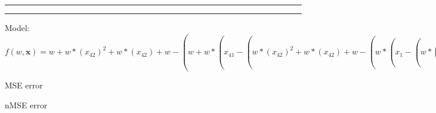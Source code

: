 \documentclass[12pt]{article}
\begin{document}
\hrule
\vspace{1cm}
\hrule
\vspace{1cm}
Model: $f(w,\mathbf{x})=w+w*(x_42)^2+w*(x_42)+w-(w+w*(x_41-(w*(x_42)^2+w*(x_42)+w-(w*(x_1-(w*(w*(sin(w+x_13-(w*(w+x_13-(w*(w+w+x_21)^2+w*(w+w+x_21)+w))^2+w*(w+x_13-(w*(w+w+x_21)^2+w*(w+w+x_21)+w))+w)))^2+w*(sin(w+x_13-(w*(w+x_13-(w*(w+w+x_21)^2+w*(w+w+x_21)+w))^2+w*(w+x_13-(w*(w+w+x_21)^2+w*(w+w+x_21)+w))+w)))+w)^2+w*(w*(sin(w+x_13-(w*(w+x_13-(w*(w+w+x_21)^2+w*(w+w+x_21)+w))^2+w*(w+x_13-(w*(w+w+x_21)^2+w*(w+w+x_21)+w))+w)))^2+w*(sin(w+x_13-(w*(w+x_13-(w*(w+w+x_21)^2+w*(w+w+x_21)+w))^2+w*(w+x_13-(w*(w+w+x_21)^2+w*(w+w+x_21)+w))+w)))+w)+w))^2+w*(x_1-(w*(w*(sin(w+x_13-(w*(w+x_13-(w*(w+w+x_21)^2+w*(w+w+x_21)+w))^2+w*(w+x_13-(w*(w+w+x_21)^2+w*(w+w+x_21)+w))+w)))^2+w*(sin(w+x_13-(w*(w+x_13-(w*(w+w+x_21)^2+w*(w+w+x_21)+w))^2+w*(w+x_13-(w*(w+w+x_21)^2+w*(w+w+x_21)+w))+w)))+w)^2+w*(w*(sin(w+x_13-(w*(w+x_13-(w*(w+w+x_21)^2+w*(w+w+x_21)+w))^2+w*(w+x_13-(w*(w+w+x_21)^2+w*(w+w+x_21)+w))+w)))^2+w*(sin(w+x_13-(w*(w+x_13-(w*(w+w+x_21)^2+w*(w+w+x_21)+w))^2+w*(w+x_13-(w*(w+w+x_21)^2+w*(w+w+x_21)+w))+w)))+w)+w))+w)))^2+w*(x_41-(w*(x_42)^2+w*(x_42)+w-(w*(x_1-(w*(w*(sin(w+x_13-(w*(w+x_13-(w*(w+w+x_21)^2+w*(w+w+x_21)+w))^2+w*(w+x_13-(w*(w+w+x_21)^2+w*(w+w+x_21)+w))+w)))^2+w*(sin(w+x_13-(w*(w+x_13-(w*(w+w+x_21)^2+w*(w+w+x_21)+w))^2+w*(w+x_13-(w*(w+w+x_21)^2+w*(w+w+x_21)+w))+w)))+w)^2+w*(w*(sin(w+x_13-(w*(w+x_13-(w*(w+w+x_21)^2+w*(w+w+x_21)+w))^2+w*(w+x_13-(w*(w+w+x_21)^2+w*(w+w+x_21)+w))+w)))^2+w*(sin(w+x_13-(w*(w+x_13-(w*(w+w+x_21)^2+w*(w+w+x_21)+w))^2+w*(w+x_13-(w*(w+w+x_21)^2+w*(w+w+x_21)+w))+w)))+w)+w))^2+w*(x_1-(w*(w*(sin(w+x_13-(w*(w+x_13-(w*(w+w+x_21)^2+w*(w+w+x_21)+w))^2+w*(w+x_13-(w*(w+w+x_21)^2+w*(w+w+x_21)+w))+w)))^2+w*(sin(w+x_13-(w*(w+x_13-(w*(w+w+x_21)^2+w*(w+w+x_21)+w))^2+w*(w+x_13-(w*(w+w+x_21)^2+w*(w+w+x_21)+w))+w)))+w)^2+w*(w*(sin(w+x_13-(w*(w+x_13-(w*(w+w+x_21)^2+w*(w+w+x_21)+w))^2+w*(w+x_13-(w*(w+w+x_21)^2+w*(w+w+x_21)+w))+w)))^2+w*(sin(w+x_13-(w*(w+x_13-(w*(w+w+x_21)^2+w*(w+w+x_21)+w))^2+w*(w+x_13-(w*(w+w+x_21)^2+w*(w+w+x_21)+w))+w)))+w)+w))+w)))+w-(w*(x_48)^2+w*(x_48)+w))$

MSE error

nMSE error
\end{document}
